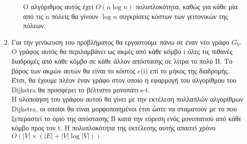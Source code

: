 \documentclass{article}
\begin{document}
\begin{enumerate}
\begin{itemize}
Ο αλγόριθμος αυτός έχει $O(n\log n )$ πολυπλοκότητα, καθώς για κάθε μία από τις n πόλεις θα γίνουν $\log n $ συγκρίσεις κόστων των γειτονικών της πόλεων.
\end{itemize}

\item Για την γενίκευση του προβλήματος θα εργαστούμε πάνω σε έναν νέο γράφο $G_V$.
\\
Ο γράφος αυτός θα περιλαμβάνει ως ακμές από κάθε κόμβο i όλες τις πιθανές διαδρομές από κάθε κόμβο σε κάθε άλλον απόστασης σε λίτρα το πολύ B. Το βάρος των ακμών αυτών θα είναι το κόστος c(i) επί το μήκος της διαδρομής. Έτσι, θα έχουμε πλέον έναν γράφο στον οποίο η εφαρμογή του αλγορίθμου του Dijkstra θα προσφέρει το βέλτιστο μονοπάτι s-t.  \\
Η υλοποίηση του γράφου αυτού θα γίνει με την εκτέλεση πολλαπλών αλγορίθμων Dijkstra, οι οποίοι θα είναι μορφοποιημένοι έτσι ώστε να σταματούν με το που ξεπεραστεί το όριο της απόστασης B κατά την εύρεση ενός μονοπατιού από κάθε κόμβο προς τον t. Η πολυπλοκότητα της εκτέλεσης αυτής απαιτεί χρόνο $O(|V| \times (|E| + |V|\log|V| ))$ 
\end{enumerate}
\end{document}
